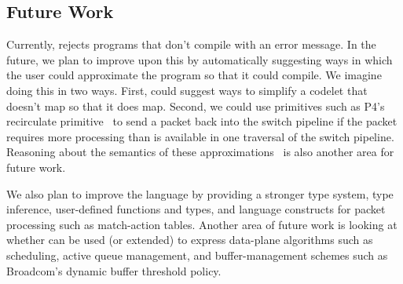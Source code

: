 \subsection{Future Work}
Currently, \pktlanguage rejects programs that don't compile with an error
message.  In the future, we plan to improve upon this by automatically
suggesting ways in which the user could approximate the program so that it
could compile. We imagine doing this in two ways. First, \pktlanguage could
suggest ways to simplify a codelet that doesn't map so that it does map.
Second, we could use primitives such as P4's recirculate primitive~\cite{p4spec}
to send a packet back into the switch pipeline if the packet
requires more processing than is available in one traversal of the switch
pipeline. Reasoning about the semantics of these
approximations~\cite{sampsonApprox, chisel} is also another area for future
work.

We also plan to improve the \pktlanguage language by providing a stronger type
system, type inference, user-defined functions and types, and language
constructs for packet processing such as match-action tables. Another area of
future work is looking at whether \pktlanguage can be used (or extended) to
express data-plane algorithms such as scheduling, active queue management, and
buffer-management schemes such as Broadcom's dynamic buffer threshold policy.

